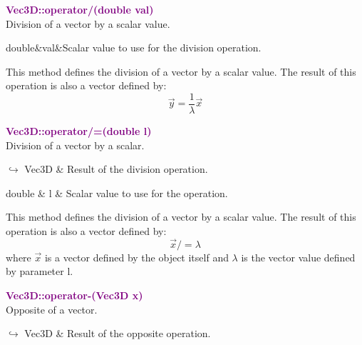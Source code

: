 \textcolor{purple}{\textbf{Vec3D::operator/(double val)}}\label{Vec3D::operator/(double val)}\\
Division of a vector by a scalar value.

\begin{tcolorbox}[width=\textwidth,myArgs,tabularx={ll|R}]
double&val&Scalar value to use for the division operation.
\end{tcolorbox}

This method defines the division of a vector by a scalar value.
The result of this operation is also a vector defined by:
\begin{equation*}
\overrightarrow{y} = \frac{1}{\lambda}\overrightarrow{x}
\end{equation*}

\textcolor{purple}{\textbf{Vec3D::operator/=(double l)}}\label{Vec3D::operator/=(double l)}\\
Division of a vector by a scalar.\vspace*{-0.5em}
\begin{tcolorbox}[grow to left by=-1cm, width=\textwidth-1cm,myArgs,tabularx={l|R}]
$\hookrightarrow$ Vec3D & Result of the division operation.
\end{tcolorbox}

\begin{tcolorbox}[width=\textwidth,myArgs,tabularx={ll|R}]
double & l & Scalar value to use for the operation.
\end{tcolorbox}

This method defines the division of a vector by a scalar value.
The result of this operation is also a vector defined by:
\begin{equation*}
\overrightarrow{x} /= \lambda
\end{equation*}
where $\overrightarrow{x}$ is a vector defined by the object itself and $\lambda$ is the vector value defined by parameter l.

\textcolor{purple}{\textbf{Vec3D::operator-(Vec3D x)}}\label{Vec3D::operator-(Vec3D x)}\\
Opposite of a vector.\vspace*{-0.5em}
\begin{tcolorbox}[grow to left by=-1cm, width=\textwidth-1cm,myArgs,tabularx={l|R}]
$\hookrightarrow$ Vec3D & Result of the opposite operation.
\end{tcolorbox}

